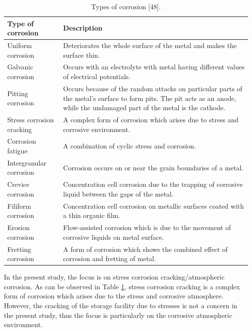 \documentclass[12pt]{report}
\begin{document}
\begin{table}[H]
\caption{Types of corrosion [48].}

\centering
\begin{tabular}{m{} m{}}
    \hline
    Type of corrosion & Description \\
    \hline
    Uniform corrosion & Deteriorates the whole surface of the metal and makes the surface thin. \\
    Galvanic corrosion & Occurs with an electrolyte with metal having different values of electrical potentials. \\
    Pitting corrosion & Occurs because of the random attacks on particular parts of the metal’s surface to form pits. The pit acts as an anode, while the undamaged part of the metal is the cathode. \\
    Stress corrosion cracking & A complex form of corrosion which arises due to stress and  corrosive environment. \\
    Corrosion fatigue & A combination of cyclic stress and corrosion.  \\
    Intergranular corrosion & Corrosion occurs on or near the grain boundaries of a metal.  \\
    Crevice corrosion & Concentration cell corrosion due to the trapping of corrosive liquid  between the gaps of the metal. \\
    Filiform corrosion & Concentration cell corrosion on metallic surfaces coated with a thin  organic film. \\
    Erosion corrosion & Flow-assisted corrosion which is due to the movement of corrosive  liquids on metal surface. \\
    Fretting corrosion & A form of corrosion which shows the combined effect of corrosion and  fretting of metal. \\
    \hline
\end{tabular}

\label{ch3:table:corrosions}
\end{table}

In the present study, the focus is on stress corrosion cracking/atmospheric corrosion. As can be observed in Table \ref{ch3:table:corrosions}, stress corrosion cracking is a complex form of corrosion which arises due to the stress and corrosive atmosphere. However, the cracking of the storage facility due to stresses is not a concern in the present study, thus the focus is particularly on the corrosive atmospheric environment.
\end{document}
